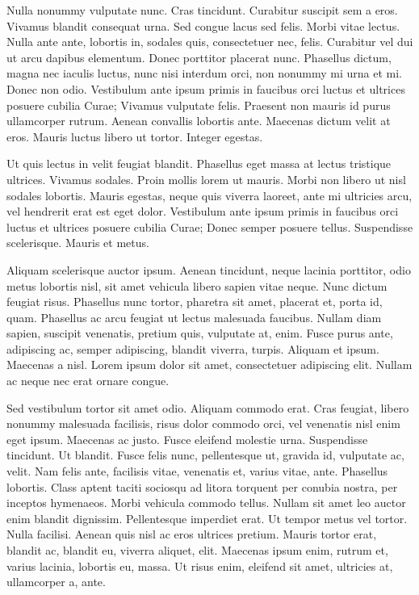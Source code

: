 \documentclass{icldt}
\begin{document}
Nulla nonummy vulputate nunc. Cras tincidunt. Curabitur suscipit sem a eros.
Vivamus blandit consequat urna. Sed congue lacus sed felis. Morbi vitae lectus.
Nulla ante ante, lobortis in, sodales quis, consectetuer nec, felis. Curabitur
vel dui ut arcu dapibus elementum. Donec porttitor placerat nunc. Phasellus
dictum, magna nec iaculis luctus, nunc nisi interdum orci, non nonummy mi urna
et mi. Donec non odio. Vestibulum ante ipsum primis in faucibus orci luctus et
ultrices posuere cubilia Curae; Vivamus vulputate felis. Praesent non mauris id
purus ullamcorper rutrum. Aenean convallis lobortis ante. Maecenas dictum velit
at eros. Mauris luctus libero ut tortor. Integer egestas.

Ut quis lectus in velit feugiat blandit. Phasellus eget massa at lectus
tristique ultrices. Vivamus sodales. Proin mollis lorem ut mauris. Morbi non
libero ut nisl sodales lobortis. Mauris egestas, neque quis viverra laoreet,
ante mi ultricies arcu, vel hendrerit erat est eget dolor. Vestibulum ante ipsum
primis in faucibus orci luctus et ultrices posuere cubilia Curae; Donec semper
posuere tellus. Suspendisse scelerisque. Mauris et metus.

Aliquam scelerisque auctor ipsum. Aenean tincidunt, neque lacinia porttitor,
odio metus lobortis nisl, sit amet vehicula libero sapien vitae neque. Nunc
dictum feugiat risus. Phasellus nunc tortor, pharetra sit amet, placerat et,
porta id, quam. Phasellus ac arcu feugiat ut lectus malesuada faucibus. Nullam diam
sapien, suscipit venenatis, pretium quis, vulputate at, enim. Fusce purus ante,
adipiscing ac, semper adipiscing, blandit viverra, turpis. Aliquam et ipsum.
Maecenas a nisl. Lorem ipsum dolor sit amet, consectetuer adipiscing elit.
Nullam ac neque nec erat ornare congue.

Sed vestibulum tortor sit amet odio. Aliquam commodo erat. Cras feugiat, libero
nonummy malesuada facilisis, risus dolor commodo orci, vel venenatis nisl enim
eget ipsum. Maecenas ac justo. Fusce eleifend molestie urna. Suspendisse
tincidunt. Ut blandit. Fusce felis nunc, pellentesque ut, gravida id, vulputate
ac, velit. Nam felis ante, facilisis vitae, venenatis et, varius vitae, ante.
Phasellus lobortis. Class aptent taciti sociosqu ad litora torquent per
conubia nostra, per inceptos hymenaeos. Morbi vehicula commodo tellus. Nullam
sit amet leo auctor enim blandit dignissim. Pellentesque imperdiet erat. Ut
tempor metus vel tortor. Nulla facilisi. Aenean quis nisl ac eros ultrices
pretium. Mauris tortor erat, blandit ac, blandit eu, viverra aliquet, elit.
Maecenas ipsum enim, rutrum et, varius lacinia, lobortis eu, massa. Ut risus
enim, eleifend sit amet, ultricies at, ullamcorper a, ante.
\end{document}
